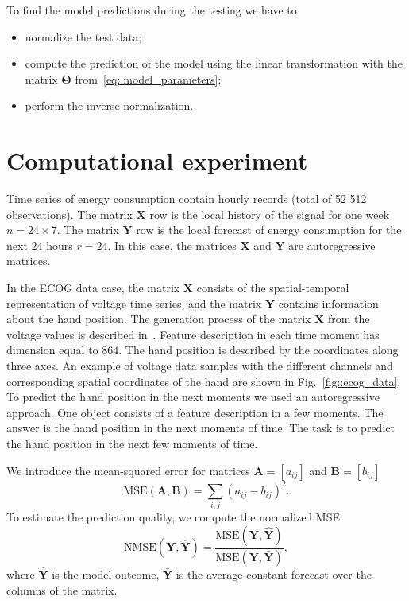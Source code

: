 \documentclass[12pt,twoside]{article}
\begin{document}
To find the model predictions during the testing we have to
\begin{itemize}
	\item normalize the test data;
	\item compute the prediction of the model using the linear transformation with the matrix $\boldsymbol{\Theta}$ from~\eqref{eq::model_parameters};
	\item perform the inverse normalization.
\end{itemize}

\section{Computational experiment}
\label{sec:exper}

Time series of energy consumption contain hourly records (total of 52 512 observations). 
The matrix $\mathbf{X}$ row is the local history of the signal for one week $n = 24 \times 7$. 
The matrix $\mathbf{Y}$ row is the local forecast of energy consumption for the next 24 hours $r = 24$. 
In this case, the matrices $\mathbf{X}$ and $\mathbf{Y}$ are autoregressive matrices.

In the ECOG data case, the matrix $\mathbf{X}$ consists of the spatial-temporal representation of voltage time series, and the matrix $\mathbf{Y}$ contains information about the hand position.
The generation process of the matrix $\mathbf{X}$ from the voltage values is described in~\cite{gasanov2017pls}. 
Feature description in each time moment has dimension equal to $864$. The hand position is described by the coordinates along three axes. 
An example of voltage data samples with the different channels and corresponding spatial coordinates of the hand are shown in Fig.~\ref{fig::ecog_data}.
To predict the hand position in the next moments we used an autoregressive approach.
One object consists of a feature description in a few moments. 
The answer is the hand position in the next moments of time.
The task is to predict the hand position in the next few moments of time.

We introduce the mean-squared error for matrices $\mathbf{A} = [a_{ij}]$ and $\mathbf{B} = [b_{ij}]$ 
\[
\text{MSE} (\mathbf{A}, \mathbf{B}) = \sum_{i,j} (a_{ij} - b_{ij})^2.
\]
To estimate the prediction quality, we compute the normalized MSE 
\begin{equation}
\text{NMSE}(\mathbf{Y},  \mathbf{\hat{Y}}) = \frac{\text{MSE} (\mathbf{Y}, \mathbf{\hat{Y}})}{\text{MSE} (\mathbf{Y}, \mathbf{\bar{Y}})},
\label{eq::nmse}
\end{equation}
where $\mathbf{\hat{Y}}$ is the model outcome, $\mathbf{\bar{Y}}$ is the average constant forecast over the columns of the matrix.
\end{document}
